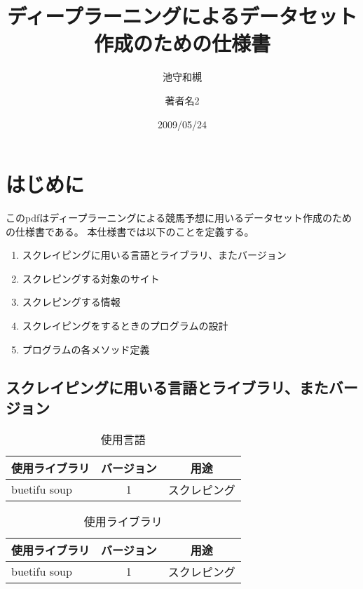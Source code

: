 \documentclass{jsarticle}
\title {ディープラーニングによるデータセット作成のための仕様書}
\author{池守和槻 \and 著者名2}
\date{2009/05/24}
\begin{document}
  \maketitle

  \section{はじめに}
    このpdfはディープラーニングによる競馬予想に用いるデータセット作成のための仕様書である。
    本仕様書では以下のことを定義する。
    \begin{enumerate}
      \item スクレイピングに用いる言語とライブラリ、またバージョン
      \item スクレピングする対象のサイト
      \item スクレピングする情報
      \item スクレイピングをするときのプログラムの設計
      \item プログラムの各メソッド定義
    \end{enumerate}

  \subsection{スクレイピングに用いる言語とライブラリ、またバージョン}
    \begin{table}[htb]
      \begin{center}
        \caption{使用言語}
        \begin{tabular}{|l|c|c|} \hline
          使用ライブラリ & バージョン & 用途 \\ \hline \hline
          buetifu soup & 1     & スクレピング  \\ \hline
        \end{tabular}
      \end{center}
    \end{table}


    \begin{table}[htb]
      \begin{center}
        \caption{使用ライブラリ}
        \begin{tabular}{|l|c|c|} \hline
          使用ライブラリ & バージョン & 用途 \\ \hline \hline
          buetifu soup & 1     & スクレピング  \\ \hline
        \end{tabular}
      \end{center}
    \end{table}
\end{document}
